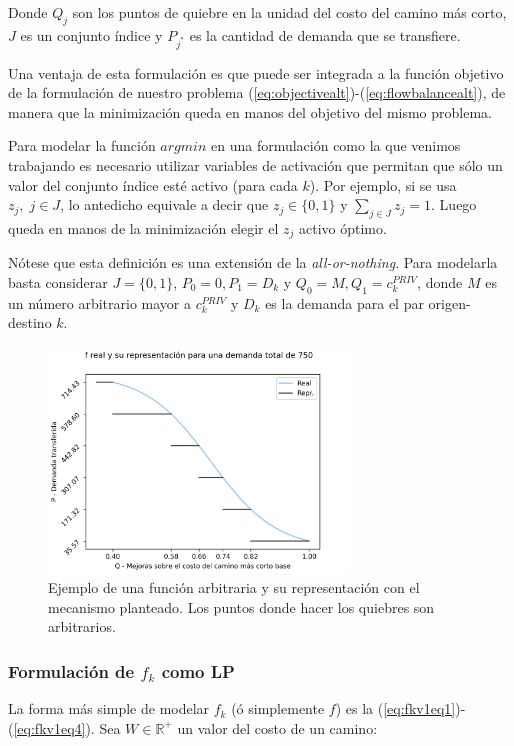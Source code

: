 \documentclass{article}
\begin{document}
  Donde $Q_j$ son los puntos de quiebre en la unidad del costo del camino más corto, $J$ es un conjunto índice y $P_{j^*}$ es la cantidad de demanda que se transfiere.

  Una ventaja de esta formulación es que puede ser integrada a la función objetivo de la formulación de nuestro problema (\ref{eq:objectivealt})-(\ref{eq:flowbalancealt}), de manera que la minimización queda en manos del objetivo del mismo problema.

  Para modelar la función $argmin$ en una formulación como la que venimos trabajando es necesario utilizar variables de activación que permitan que sólo un valor del conjunto índice esté activo (para cada $k$). Por ejemplo, si se usa $z_j,\; j \in J$, lo antedicho equivale a decir que $z_j \in \{0,1\}$ y $\sum_{j \in J} z_j = 1$. Luego queda en manos de la minimización elegir el $z_j$ activo óptimo.

  Nótese que esta definición es una extensión de la {\it all-or-nothing}. Para modelarla basta considerar $J = \{0, 1\}$, $P_0 = 0, P_1 = D_k$ y $Q_0 = M, Q_1 = c^{PRIV}_k$, donde $M$ es un número arbitrario mayor a $c^{PRIV}_k$ y $D_k$ es la demanda para el par origen-destino $k$.

  \begin{figure}[h!]
    \centering
    \includegraphics[width=8cm]{../resources/f_example.png}
    \caption{Ejemplo de una función arbitraria y su representación con el mecanismo planteado. Los puntos donde hacer los quiebres son arbitrarios.}
    \label{fig:fdrawexample}
  \end{figure}

  \FloatBarrier
  \subsubsection{Formulación de $f_k$ como LP}

  La forma más simple de modelar $f_k$ (ó simplemente $f$) es la (\ref{eq:fkv1eq1})-(\ref{eq:fkv1eq4}). Sea $W \in \mathbb{R}^+$ un valor del costo de un camino:
\end{document}
